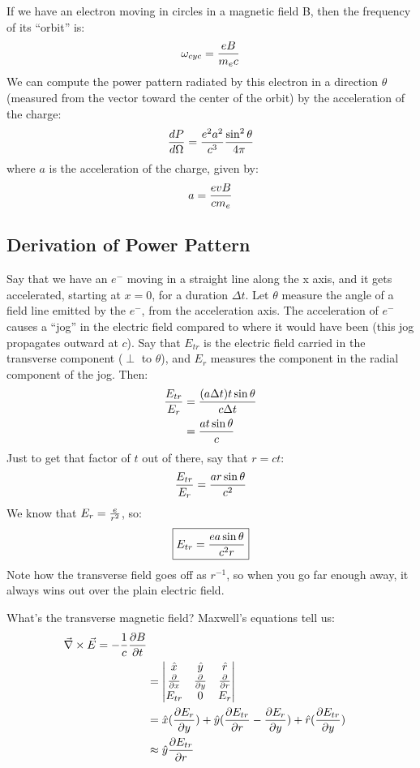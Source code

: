 \documentclass[11pt]{article}
\def\^{\hat}
\def\tr{\nabla}
\def\dce{\vec\tr\times\vec E}
\begin{document}
If we have an electron moving in circles in a magnetic field B, then the
frequency of its ``orbit'' is:
$$\omega_{cyc}={eB\over m_ec}$$
We can compute the power pattern radiated by this electron in a direction 
$\theta$ (measured from the vector toward the center of the orbit) by the 
acceleration of the charge:
$${dP\over d\Omega}={e^2a^2\over c^3}{\sin^2\theta\over4\pi}$$
where $a$ is the acceleration of the charge, given by:
$$a={evB\over cm_e}$$

\subsection*{ Derivation of Power Pattern}

Say that we have an $e^-$ moving in a straight line along the x axis, and
it gets accelerated, starting at $x=0$, for a duration $\Delta t$.  Let
$\theta$ measure the angle of a field line emitted by the $e^-$, from the
acceleration axis.  The 
acceleration of $e^-$ causes a ``jog'' in the electric field compared to where
it would have been (this jog propagates outward at $c$).  Say that $E_{tr}$
is the electric field carried in the transverse component 
($\perp$ to $\theta$), and
$E_r$ measures the component in the radial component of the jog.  Then:
$$\begin{aligned}{E_{tr}\over E_r}&={(a\Delta t)t\sin\theta\over c\Delta t}\\ 
&={at\sin\theta\over c}\\ \end{aligned}$$
Just to get that factor of $t$ out of there, say that $r=ct$:
$${E_{tr}\over E_r}={ar\sin\theta\over c^2}$$
We know that $E_r={e\over r^2}$, so:
$$\boxed{E_{tr}={ea\sin\theta\over c^2r}}$$
Note how the transverse field goes off as $r^{-1}$, so when
you go far enough away, it always wins out over the plain electric field.\par
What's the transverse magnetic field?  Maxwell's equations tell us:
$$\begin{aligned}\dce=-{1\over c}{\partial B\over\partial t}\\ 
&=\vmatrix\^x&\^y&\^r\\
{\partial\over\partial x}&{\partial\over\partial y}&{\partial\over\partial r}\\
E_{tr}&0&E_r\endvmatrix\\ 
&=\^x({\partial E_r\over\partial y})+\^y({\partial E_{tr}\over\partial r}
-{\partial E_r\over\partial y})+\^r({\partial E_{tr}\over\partial y})\\ 
&\approx\^y{\partial E_{tr}\over\partial r}\\ \end{aligned}$$
\end{document}
